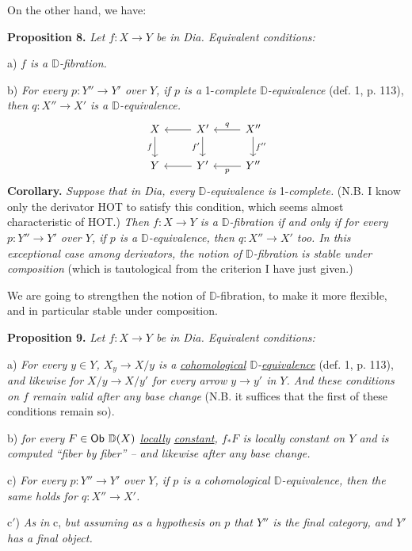 \documentclass[11pt]{article}
\newcommand{\printedpage}[1]{\marginpar{\footnotesize p.~#1}}
\newcommand{\msp}[1]{\marginpar{\footnotesize [#1]}}
\newcommand{\D}{\mathbb{D}}
\newcommand{\sfup}[1]{\textsf{\upshape #1}}
\newcommand{\Dia}{\sfup{Dia}}
\newcommand{\HOT}{\sfup{HOT}}
\newcommand{\Ob}{\sfup{Ob}}
\begin{document}
\msp{page 120}On the other hand, we have:

\textbf{Proposition 8.} \textit{Let $f : X \to Y$ be in \Dia. Equivalent conditions:}

a) \textit{$f$ is a $\D$-fibration.}

b) \textit{For every $p : Y'' \to Y'$ over $Y$, if $p$ is a} 1-\textit{complete $\D$-equivalence} (def. 1, p. 113), \textit{then $q : X'' \to X'$ is a $\D$-equivalence.}
\[
\begin{tikzcd}
X \arrow[d, "f"'] & X' \arrow[l] \arrow[d, "f'"'] & X'' \arrow[l, "q"'] \arrow[d, "f''"] \\
Y & Y' \arrow[l] & Y'' \arrow[l, "p"]
\end{tikzcd}
\]
\textbf{Corollary.} \textit{Suppose that in \Dia, every $\D$-equivalence is} 1-\textit{complete.} (N.B. I know only the derivator \HOT{} to satisfy this condition, which seems almost characteristic of \HOT.) \textit{Then $f : X \to Y$ is a $\D$-fibration if and only if for every $p : Y'' \to Y'$ over $Y$, if $p$ is a $\D$-equivalence, then $q : X'' \to X'$ too. In this exceptional case among derivators, the notion of $\D$-fibration is stable under composition} (which is tautological from the criterion I have just given.)

\printedpage{72}

We are going to strengthen the notion of $\D$-fibration, to make it more flexible, and in particular stable under composition.

\textbf{Proposition 9.} \textit{Let $f : X \to Y$ be in \Dia. Equivalent conditions:}

a) \textit{For every $y \in Y$, $X_y \to X/y$ is a \underline{cohomological} $\D$-\underline{equivalence}} (def. 1, p. 113), \textit{and likewise for $X/y \to X/y'$ for every arrow $y \to y'$ in $Y$. And these conditions on $f$ remain valid after any base change} (N.B. it suffices that the first of these conditions remain so).

\msp{page 121}b) \textit{for every $F \in \Ob\ \D(X)$ \underline{locally} \underline{constant}, $f_*F$ is locally constant on $Y$ and is computed ``fiber by fiber'' -- and likewise after any base change.} %

c) \textit{For every $p : Y'' \to Y'$ over $Y$, if $p$ is a cohomological $\D$-equivalence, then the same holds for $q : X'' \to X'$.}

c$'$) \textit{As in} c, \textit{but assuming as a hypothesis on $p$ that $Y''$ is the final category, and $Y'$ has a final object.}
\end{document}
